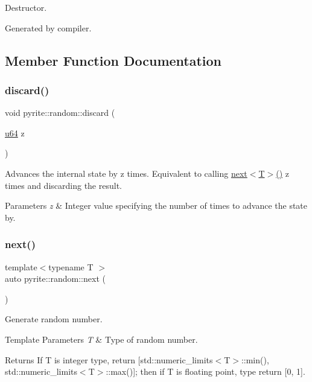 Destructor.

Generated by compiler. 

\subsection{Member Function Documentation}
\mbox{\label{classpyrite_1_1random_a8414030e5c428c20b8a8333542918f8c}} 
\subsubsection{\texorpdfstring{discard()}{discard()}}
{\footnotesize\ttfamily void pyrite\+::random\+::discard (\begin{DoxyParamCaption}\item[{\mbox{\hyperlink{type_8hpp_a89cb75b6e56f357c2964bbd5520be899}{u64}}}]{z }\end{DoxyParamCaption})}

Advances the internal state by z times. Equivalent to calling \mbox{\hyperlink{classpyrite_1_1random_a708282ad1435ee4b9564c8e11baf43f8}{next$<$\+T$>$()}} z times and discarding the result.


\begin{DoxyParams}{Parameters}
{\em z} & Integer value specifying the number of times to advance the state by. \\
\hline
\end{DoxyParams}
\mbox{\label{classpyrite_1_1random_a708282ad1435ee4b9564c8e11baf43f8}} 
\subsubsection{\texorpdfstring{next()}{next()}\hspace{0.1cm}{\footnotesize\ttfamily [1/2]}}
{\footnotesize\ttfamily template$<$typename T $>$ \\
auto pyrite\+::random\+::next (\begin{DoxyParamCaption}{ }\end{DoxyParamCaption})}

Generate random number.


\begin{DoxyTemplParams}{Template Parameters}
{\em T} & Type of random number.\\
\hline
\end{DoxyTemplParams}
\begin{DoxyReturn}{Returns}
If T is integer type, return \mbox{[}std\+::numeric\+\_\+limits$<$\+T$>$\+::min(), std\+::numeric\+\_\+limits$<$\+T$>$\+::max()\mbox{]}; then if T is floating point, type return \mbox{[}0, 1\mbox{]}. 
\end{DoxyReturn}
\mbox{\label{classpyrite_1_1random_a79e67ec7537ab7e872cb1327dbe0bb3e}} 

